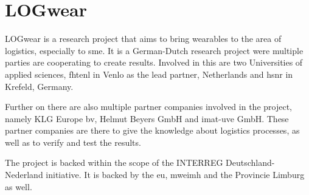 \section{LOGwear}\label{sec:logwear}
LOGwear is a research project that aims to bring wearables to the area of logistics, especially to \gls{sme}. It is a German-Dutch research project were multiple parties are cooperating to create results. Involved in this are two Universities of applied sciences, \gls{fhtenl} in Venlo as the lead partner, Netherlands and \gls{hsnr} in Krefeld, Germany.

Further on there are also multiple partner companies involved in the project, namely KLG Europe bv, Helmut Beyers GmbH and imat-uve GmbH. These partner companies are there to give the knowledge about logistics processes, as well as to verify and test the results.

The project is backed within the scope of the INTERREG Deutschland-Nederland initiative. It is backed by the \gls{eu}, \gls{mweimh} and the Provincie Limburg as well.